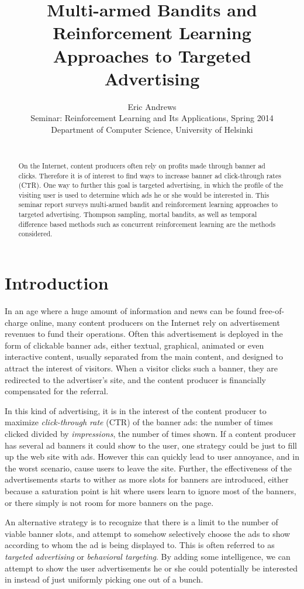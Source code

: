 \documentclass{article} %
\title{Multi-armed Bandits and Reinforcement Learning Approaches to Targeted
Advertising}
\author{
Eric Andrews \\
Seminar: Reinforcement Learning and Its Applications, Spring 2014 \\
Department of Computer Science, University of Helsinki\\\\
}
\begin{document}
\maketitle

\begin{abstract}
  On the Internet, content producers often rely on profits made through banner
  ad clicks. Therefore it is of interest to find ways to increase banner ad
  click-through rates (CTR). One way to further this goal is targeted
  advertising, in which the profile of the visiting user is used to determine
  which ads he or she would be interested in. This seminar report surveys
  multi-armed bandit and reinforcement learning approaches to targeted
  advertising. Thompson sampling, mortal bandits, as well as temporal
  difference based methods such as concurrent reinforcement learning are the
  methods considered.
\end{abstract}

\section{Introduction}

In an age where a huge amount of information and news can be found
free-of-charge online, many content producers on the Internet rely on
advertisement revenues to fund their operations. Often this advertisement is
deployed in the form of clickable banner ads, either textual, graphical,
animated or even interactive content, usually separated from the main content,
and designed to attract the interest of visitors. When a visitor clicks such a
banner, they are redirected to the advertiser's site, and the content producer
is financially compensated for the referral.

In this kind of advertising, it is in the interest of the content producer to
maximize \emph{click-through rate} (CTR) of the banner ads: the number of times
clicked divided by \emph{impressions}, the number of times shown. If a content
producer has several ad banners it could show to the user, one strategy could
be just to fill up the web site with ads. However this can quickly lead to user
annoyance, and in the worst scenario, cause users to leave the site. Further,
the effectiveness of the advertisements starts to wither as more slots for
banners are introduced, either because a saturation point is hit where users
learn to ignore most of the banners, or there simply is not room for more
banners on the page.

An alternative strategy is to recognize that there is a limit to the number of
viable banner slots, and attempt to somehow selectively choose the ads to show
according to whom the ad is being displayed to. This is often referred to as
\emph{targeted advertising} or \emph{behavioral targeting}. By adding some
intelligence, we can attempt to show the user advertisements he or she could
potentially be interested in instead of just uniformly picking one out of a
bunch.
\end{document}
